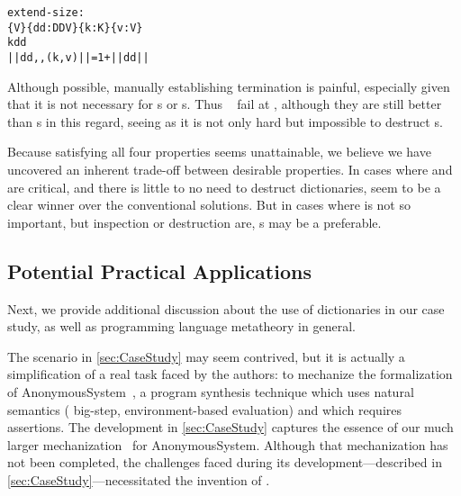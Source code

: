 \begin{alltt}
  extend-size :
    \altFAll\{V\} \{dd : DD V\} \{k : K\} \{v : V\} \altRArr
      k \altNIn dd \altRArr
      || dd ,, (k , v) || = 1 + || dd ||
\end{alltt}

Although possible, manually establishing termination is painful, especially given that it is not necessary
for {\sal}s or {\cal}s. Thus \dds~ fail at \EzDstr, although they are still better than {\fpf}s in this
regard, seeing as it is not only hard but impossible to destruct {\fpf}s.



Because satisfying all four properties seems unattainable,
we believe we have uncovered an
inherent trade-off between desirable properties. In cases where \SemTot{} and \EqDec{} are critical,
and there is little to no need to destruct dictionaries, \dds{} seem to be a clear winner over
the conventional solutions. But in cases where \SemTot{} is not so important,
but inspection or destruction are, {\cal}s may be a preferable.

\subsection{Potential Practical Applications}

Next, we provide additional discussion about the use of dictionaries in our case study, as well as programming language metatheory in general.



The scenario in \autoref{sec:CaseStudy} may seem contrived, but it is actually a simplification of a real task faced by the authors:
%
to mechanize the formalization of AnonymousSystem~\citep{AnonymousSystem}, a program synthesis technique which uses
natural semantics (\ie{} big-step, environment-based evaluation) and which requires assertions.
%
The development in \autoref{sec:CaseStudy} captures the essence of our much larger mechanization~\citep{AnonymousURL} for AnonymousSystem.
%
Although that mechanization has not been completed, the challenges faced during its development---described in \autoref{sec:CaseStudy}---necessitated the invention of \dds.

